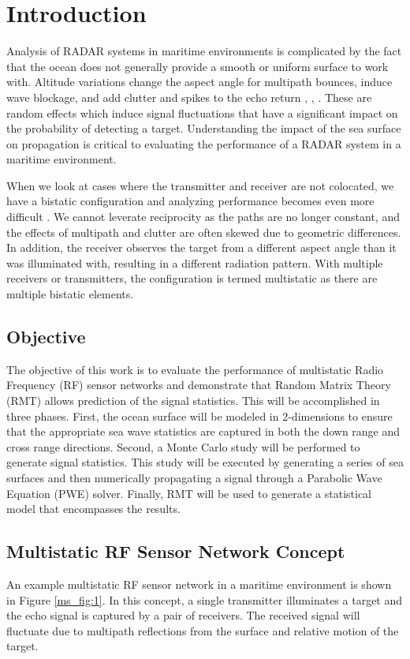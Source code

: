\chapter{Introduction}
Analysis of RADAR systems in maritime environments is complicated by the fact that the ocean does not generally provide a smooth or uniform surface to work with. Altitude variations change the aspect angle for multipath bounces, induce wave blockage, and add clutter and spikes to the echo return \cite{skolnik_handbook}, \cite{blake_radar}, \cite{nathanson_radar}. These are random effects which induce signal fluctuations that have a significant impact on the probability of detecting a target. Understanding the impact of the sea surface on propagation is critical to evaluating the performance of a RADAR system in a maritime environment.

When we look at cases where the transmitter and receiver are not colocated, we have a bistatic configuration and analyzing performance becomes even more difficult \cite{willis_bistatic}. We cannot leverate reciprocity as the paths are no longer constant, and the effects of multipath and clutter are often skewed due to geometric differences.  In addition, the receiver observes the target from a different aspect angle than it was illuminated with, resulting in a different radiation pattern. With multiple receivers or transmitters, the configuration is termed multistatic as there are multiple bistatic elements.

\section{Objective}
The objective of this work is to evaluate the performance of multistatic Radio Frequency (RF) sensor networks and demonstrate that Random Matrix Theory (RMT) allows prediction of the signal statistics. This will be accomplished in three phases. First, the ocean surface will be modeled in 2-dimensions to ensure that the appropriate sea wave statistics are captured in both the down range and cross range directions. Second, a Monte Carlo study will be performed to generate signal statistics. This study will be executed by generating a series of sea surfaces and then numerically propagating a signal through a Parabolic Wave Equation (PWE) solver. Finally, RMT will be used to generate a statistical model that encompasses the results.

\section{Multistatic RF Sensor Network Concept}
An example multistatic RF sensor network in a maritime environment is shown in Figure \ref{ms_fig:1}. In this concept, a single transmitter illuminates a target and the echo signal is captured by a pair of receivers. The received signal will fluctuate due to multipath reflections from the surface and relative motion of the target.

